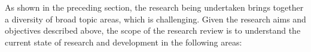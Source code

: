 \documentclass[11pt, a4paper, oneside]{report} %
\begin{document}










As shown in the preceding section, the research being undertaken brings together
a diversity of broad topic areas, which is challenging. Given the research aims
and objectives described above, the scope of the research review is to
understand the current state of research and development in the following areas:
\end{document}
